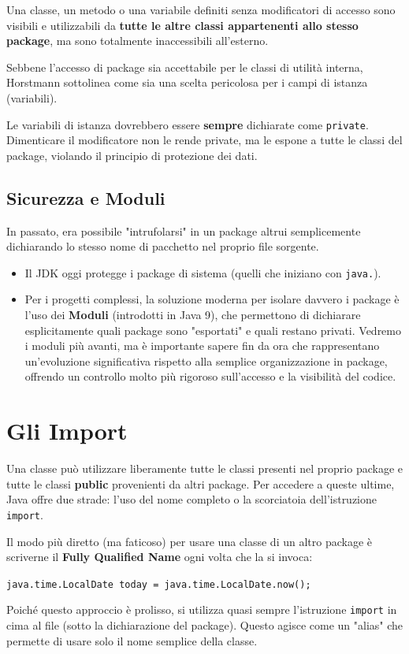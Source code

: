 Una classe, un metodo o una variabile definiti senza modificatori di accesso sono visibili e utilizzabili da \textbf{tutte le altre classi appartenenti allo stesso package}, ma sono totalmente inaccessibili all'esterno.

Sebbene l'accesso di package sia accettabile per le classi di utilità interna, Horstmann sottolinea come sia una scelta pericolosa per i campi di istanza (variabili).

\begin{warningbox}
    Le variabili di istanza dovrebbero essere \textbf{sempre} dichiarate come \texttt{private}. Dimenticare il modificatore non le rende private, ma le espone a tutte le classi del package, violando il principio di protezione dei dati.
\end{warningbox}

\subsection{Sicurezza e Moduli}
In passato, era possibile "intrufolarsi" in un package altrui semplicemente dichiarando lo stesso nome di pacchetto nel proprio file sorgente. 
\begin{itemize}
    \item Il JDK oggi protegge i package di sistema (quelli che iniziano con \texttt{java.}).
    \item Per i progetti complessi, la soluzione moderna per isolare davvero i package è l'uso dei \textbf{Moduli} (introdotti in Java 9), che permettono di dichiarare esplicitamente quali package sono "esportati" e quali restano privati. Vedremo i moduli più avanti, ma è importante sapere fin da ora che rappresentano un'evoluzione significativa rispetto alla semplice organizzazione in package, offrendo un controllo molto più rigoroso sull'accesso e la visibilità del codice.
\end{itemize}

\section{Gli Import}

Una classe può utilizzare liberamente tutte le classi presenti nel proprio package e tutte le classi \textbf{public} provenienti da altri package. Per accedere a queste ultime, Java offre due strade: l'uso del nome completo o la scorciatoia dell'istruzione \texttt{import}.

Il modo più diretto (ma faticoso) per usare una classe di un altro package è scriverne il \textbf{Fully Qualified Name} ogni volta che la si invoca:
\begin{center}
    \texttt{java.time.LocalDate today = java.time.LocalDate.now();}
\end{center}
Poiché questo approccio è prolisso, si utilizza quasi sempre l'istruzione \texttt{import} in cima al file (sotto la dichiarazione del package). Questo agisce come un "alias" che permette di usare solo il nome semplice della classe.

